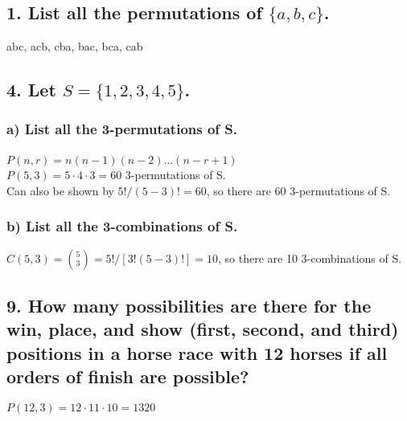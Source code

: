 \documentclass[11pt, oneside]{article} %
\numberwithin{equation}{section} %
\numberwithin{figure}{section} %
\numberwithin{table}{section} %
\begin{document}

\section{}
\subsection{1. List all the permutations of $\{a, b, c\}$.}
abc, acb, cba, bac, bca, cab

\subsection{4. Let $S = \{1,2,3,4,5\}$.}
\subsubsection{a) List all the 3-permutations of S.}
$P(n,r) = n(n-1)(n-2)$...$(n-r+1)$ \\
$P(5,3) = 5 \cdot 4 \cdot 3 = 60$ 3-permutations of S. \\
Can also be shown by $5!/(5-3)! = 60$, so there are 60 3-permutations of S. 
\subsubsection{b) List all the 3-combinations of S.}
$C(5,3) = {5 \choose 3} = 5!/[3!(5-3)!] = 10$, so there are 10 3-combinations of S.


\subsection{9. How many possibilities are there for the win, place, and show (first, second, and third) positions in a horse race with 12 horses if all orders of finish are possible?}
$P(12,3) = 12 \cdot 11 \cdot 10 = 1320$

\end{document}

